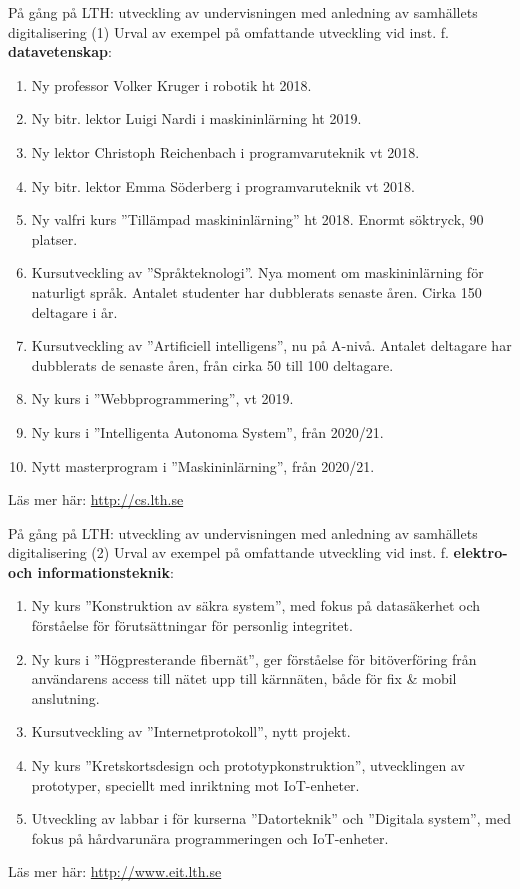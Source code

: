 \documentclass[aspectratio=169]{beamer}
\newenvironment{Slide}[1]%
  {\begin{frame}[environment=Slide]{#1}}
  {\end{frame}}%
\begin{document}
\begin{Slide}{På gång på LTH: utveckling av undervisningen med anledning av samhällets digitalisering (1)}
  Urval av exempel på omfattande utveckling vid inst. f. \textbf{datavetenskap}: 
  \begin{enumerate}\footnotesize
    \item Ny professor Volker Kruger i robotik ht 2018. 
    \item Ny bitr. lektor Luigi Nardi i maskininlärning ht 2019. 
    \item Ny lektor Christoph Reichenbach i programvaruteknik vt 2018.
    \item Ny bitr. lektor Emma Söderberg i programvaruteknik vt 2018.
    \item Ny valfri kurs ''Tillämpad maskininlärning'' ht 2018. Enormt söktryck, 90 platser.
    \item Kursutveckling av ''Språkteknologi''. Nya moment om maskininlärning för naturligt språk.  Antalet studenter har dubblerats senaste åren. Cirka 150 deltagare i år.
    \item Kursutveckling av ''Artificiell intelligens'', nu på A-nivå. Antalet deltagare har dubblerats de senaste åren, från cirka 50 till 100 deltagare.
    \item Ny kurs i ''Webbprogrammering'', vt 2019.
    \item Ny kurs i ''Intelligenta Autonoma System'', från 2020/21.
    \item Nytt masterprogram i ''Maskininlärning'', från 2020/21.
  \end{enumerate}
  Läs mer här: \url{http://cs.lth.se}
\end{Slide}

\begin{Slide}{På gång på LTH: utveckling av undervisningen med anledning av samhällets digitalisering (2)}
  Urval av exempel på omfattande utveckling vid inst. f. \textbf{elektro- och informationsteknik}: 
  \begin{enumerate}
    \item Ny kurs ''Konstruktion av säkra system'', med fokus på datasäkerhet och förståelse för förutsättningar för personlig integritet.
    \item Ny kurs i ''Högpresterande fibernät'', ger förståelse för bitöverföring från användarens access till nätet upp till kärnnäten, både för fix \& mobil anslutning.
    \item Kursutveckling av ''Internetprotokoll'', nytt projekt.
    \item Ny kurs ''Kretskortsdesign och prototypkonstruktion'', utvecklingen av prototyper, speciellt med inriktning mot IoT-enheter.
    \item Utveckling av labbar i för kurserna ''Datorteknik''  och ''Digitala system'', med fokus på hårdvarunära programmeringen och IoT-enheter. 
  \end{enumerate}
  Läs mer här: \url{http://www.eit.lth.se}
\end{Slide}
\end{document}
